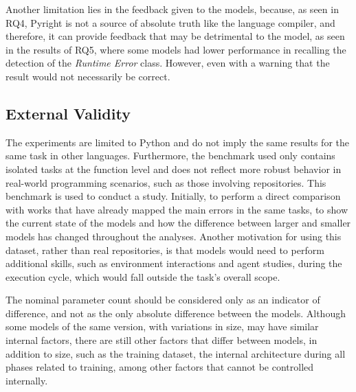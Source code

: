 Another limitation lies in the feedback given to the models, because, as seen in RQ4, Pyright is not a source of absolute truth like the language compiler, and therefore, it can provide feedback that may be detrimental to the model, as seen in the results of RQ5, where some models had lower performance in recalling the detection of the \emph{Runtime Error} class. However, even with a warning that the result would not necessarily be correct.

\subsection{External Validity}

The experiments are limited to Python and do not imply the same results for the same task in other languages. Furthermore, the benchmark used only contains isolated tasks at the function level and does not reflect more robust behavior in real-world programming scenarios, such as those involving repositories. This benchmark is used to conduct a study. Initially, to perform a direct comparison with works that have already mapped the main errors in the same tasks, to show the current state of the models and how the difference between larger and smaller models has changed throughout the analyses. Another motivation for using this dataset, rather than real repositories, is that models would need to perform additional skills, such as environment interactions and agent studies, during the execution cycle, which would fall outside the task's overall scope.

The nominal parameter count should be considered only as an indicator of difference, and not as the only absolute difference between the models. Although some models of the same version, with variations in size, may have similar internal factors, there are still other factors that differ between models, in addition to size, such as the training dataset, the internal architecture during all phases related to training, among other factors that cannot be controlled internally.